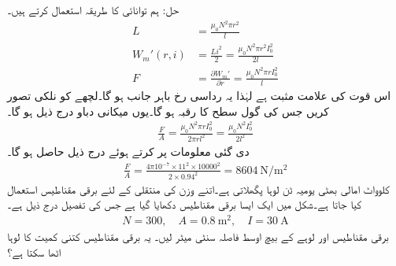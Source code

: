 حل:\quad 
ہم توانائی کا طریقہ استعمال کرتے ہیں۔
\begin{align*}
L&=\frac{\mu_0 N^2 \pi r^2}{l}\\
W_m'(r,i)&=\frac{L i^2}{2}=\frac{\mu_0 N^2 \pi r^2 I_0^2}{2 l}\\
F&=\frac{\partial W_m'}{\partial r}=\frac{\mu_0 N^2 \pi r I_0^2}{l}
\end{align*}
اس قوت کی علامت  مثبت ہے لہٰذا یہ رداسی رخ  باہر جانب ہو گا۔لچھے کو نلکی تصور کریں جس کی گول سطح  کا رقبہ  ہو گا۔یوں میکانی دباو درج ذیل ہو گا۔
\begin{align*}
\frac{F}{A}=\frac{\mu_0 N^2 \pi r I_0^2}{2\pi r l^2}=\frac{\mu_0 N^2  I_0^2}{2 l^2}
\end{align*}
دی گئی معلومات پر کرتے ہوئے درج ذیل  حاصل ہو گا۔
\begin{align*}
\frac{F}{A}=\frac{4\pi 10^{-7} \times 11^2 \times \num{10000}^2 }{2 \times 0.94^2}=\SI{8604}{\newton \per \meter \squared}
\end{align*}
%
   کلوواٹ امالی بھٹی یومیہ  ٹن لوہا  پگھلاتی ہے۔اتنے وزن کی منتقلی کے لئے برقی مقناطیس استعمال کیا جاتا ہے۔شکل  میں ایک ایسا  برقی مقناطیس دکھایا گیا ہے جس کی تفصیل درج ذیل ہے۔
\begin{align*}
N=300, \quad A=\SI{0.8}{\meter \squared}, \quad I=\SI{30}{\ampere}
\end{align*}
برقی مقناطیس اور لوہے کے بیچ اوسط فاصلہ  سنٹی میٹر لیں۔ یہ برقی مقناطیس کتنی کمیت کا لوہا اٹھا سکتا ہے؟
